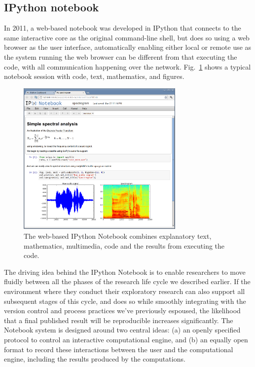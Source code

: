 \documentclass[ChapterTOCs,krantz2]{krantz} %
\begin{document}
\subsection{IPython notebook}\label{subsec:IPython}

In 2011, a web-based notebook was developed in IPython that connects to the
same interactive core as the original command-line shell, but does so using a
web browser as the user interface, automatically enabling either local or
remote use as the system running the web browser can be different from that
executing the code, with all communication happening over the network.
Fig.~\ref{fig:IPython-notebook} shows a typical notebook session with code,
text, mathematics, and figures.

\begin{figure}
  \begin{centering}
    \includegraphics[width=3.2in]{fig/ipython-notebook-specgram.png}\par
  \end{centering}

  \caption{\label{fig:IPython-notebook}The web-based IPython Notebook combines
    explanatory text, mathematics, multimedia, code and the results from
    executing the code.}
\end{figure}

The driving idea behind the IPython Notebook is to enable researchers to move
fluidly between all the phases of the research life cycle we described earlier.
If the environment where they conduct their exploratory research can also
support all subsequent stages of this cycle, and does so while smoothly
integrating with the version control and process practices we've previously
espoused, the likelihood that a final published result will be reproducible
increases significantly.  The Notebook system is designed around two central
ideas: (a) an openly specified protocol to control an interactive computational
engine, and (b) an equally open format to record these interactions between the
user and the computational engine, including the results produced by the
computations.
\end{document}
